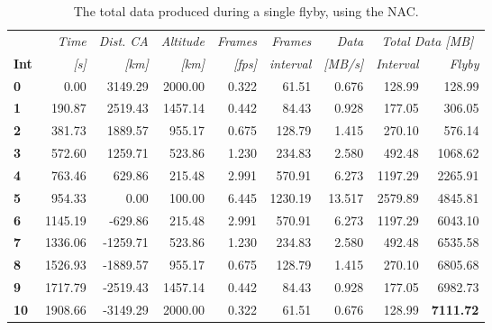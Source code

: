\begin{table}[htb]
  \centering
    \begin{tabular}{l|r|r|r|r|r|r|r|r|}
      & \textit{Time} & \textit{Dist. CA} & \textit{Altitude} & \multicolumn{1}{c|}{\textit{Frames}} & \textit{Frames} & \textit{Data} & \multicolumn{2}{c}{\textit{Total Data [MB]}} \\
\textbf{Int} & \textit{[s]} & \textit{[km]} & \textit{[km]} & \textit{[fps]} & \textit{interval} & \textit{[MB/s]} & \textit{Interval} & \multicolumn{1}{r}{\textit{Flyby}} \bigstrut[b]\\
\hline
\textbf{0} & 0.00  & 3149.29 & 2000.00 & 0.322 & 61.51 & 0.676 & 128.99 & 128.99 \bigstrut[t]\\
\textbf{1} & 190.87 & 2519.43 & 1457.14 & 0.442 & 84.43 & 0.928 & 177.05 & 306.05 \\
\textbf{2} & 381.73 & 1889.57 & 955.17 & 0.675 & 128.79 & 1.415 & 270.10 & 576.14 \\
\textbf{3} & 572.60 & 1259.71 & 523.86 & 1.230 & 234.83 & 2.580 & 492.48 & 1068.62 \\
\textbf{4} & 763.46 & 629.86 & 215.48 & 2.991 & 570.91 & 6.273 & 1197.29 & 2265.91 \\
\textbf{5} & 954.33 & 0.00  & 100.00 & 6.445 & 1230.19 & 13.517 & 2579.89 & 4845.81 \\
\textbf{6} & 1145.19 & -629.86 & 215.48 & 2.991 & 570.91 & 6.273 & 1197.29 & 6043.10 \\
\textbf{7} & 1336.06 & -1259.71 & 523.86 & 1.230 & 234.83 & 2.580 & 492.48 & 6535.58 \\
\textbf{8} & 1526.93 & -1889.57 & 955.17 & 0.675 & 128.79 & 1.415 & 270.10 & 6805.68 \\
\textbf{9} & 1717.79 & -2519.43 & 1457.14 & 0.442 & 84.43 & 0.928 & 177.05 & 6982.73 \\
\textbf{10} & 1908.66 & -3149.29 & 2000.00 & 0.322 & 61.51 & 0.676 & 128.99 & \textbf{7111.72} \\
\end{tabular}%
  \caption{The total data produced during a single flyby, using the NAC.}
  \label{tab:nac_flyby_data}%
\end{table}%
